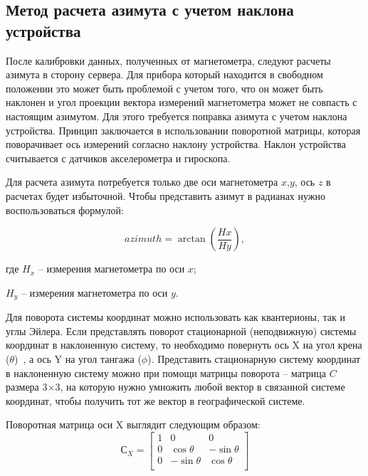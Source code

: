 \subsection{Метод расчета азимута с учетом наклона устройства}

После калибровки данных, полученных от магнетометра, следуют расчеты азимута в сторону сервера.
Для прибора который находится в свободном положении это может быть проблемой с учетом того, что
он может быть наклонен и угол проекции вектора измерений магнетометра может не совпасть с настоящим азимутом.
Для этого требуется поправка азимута с учетом наклона устройства. Принцип заключается в использовании 
поворотной матрицы, которая поворачивает ось измерений согласно наклону устройства. Наклон устройства 
считывается с датчиков акселерометра и гироскопа.

Для расчета азимута потребуется только две оси магнетометра $x$,$y$, ось $z$ в расчетах будет избыточной.
Чтобы представить азимут в радианах нужно воспользоваться формулой:

\begin{equation}
    \label{eq:domain:rawAzimuth}
    azimuth = \arctan\left(\frac{Hx}{Hy}\right),
  \end{equation}
  \begin{explanationx}
    \item[где] $H_x$  -- измерения магнетометра по оси $x$;
    \item $H_y$  -- измерения магнетометра по оси $y$.
  \end{explanationx}

Для поворота системы координат можно использовать как квантерионы, так и углы Эйлера.
Если представлять поворот стационарной (неподвижную) системы координат в наклоненную систему, то
необходимо повернуть ось X на угол крена ($\theta$)~, а ось Y на угол тангажа ($\phi$).
Представить стационарную систему координат в наклоненную систему можно при помощи матрицы поворота --
матрица $C$ размера 3×3, на которую нужно умножить любой вектор в связанной системе координат, 
чтобы получить тот же вектор в географической системе.

Поворотная матрица оси X выглядит следующим образом: \\

\begin{equation}
    \label{eq:domain:rotateXmat}
    С_{X} = \begin{bmatrix} 1 & 0 & 0 \\ 
        0 & \cos{\theta} & -\sin{\theta} \\ 
        0 & -\sin{\theta} & \cos{\theta} \\ 
        \end{bmatrix}
    \end{equation}

